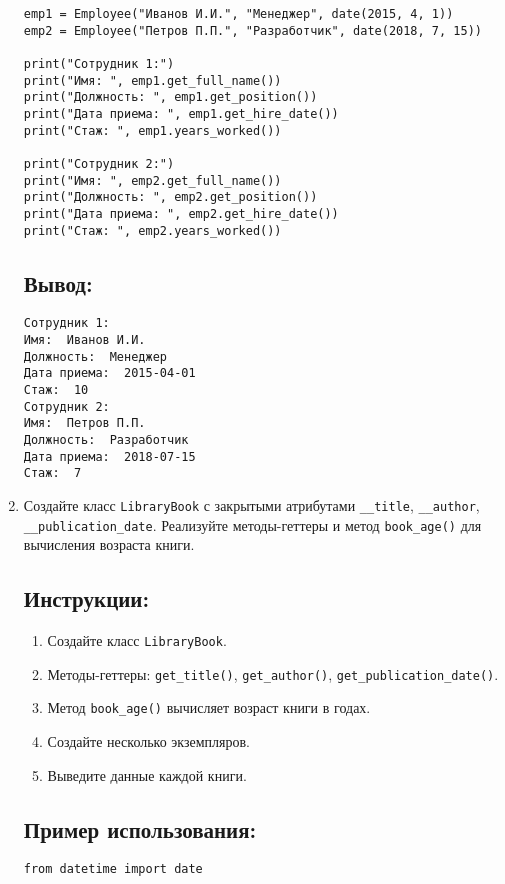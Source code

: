 \begin{enumerate}
\begin{lstlisting}[caption=Пример кода]
emp1 = Employee("Иванов И.И.", "Менеджер", date(2015, 4, 1))
emp2 = Employee("Петров П.П.", "Разработчик", date(2018, 7, 15))

print("Сотрудник 1:")
print("Имя: ", emp1.get_full_name())
print("Должность: ", emp1.get_position())
print("Дата приема: ", emp1.get_hire_date())
print("Стаж: ", emp1.years_worked())

print("Сотрудник 2:")
print("Имя: ", emp2.get_full_name())
print("Должность: ", emp2.get_position())
print("Дата приема: ", emp2.get_hire_date())
print("Стаж: ", emp2.years_worked())
\end{lstlisting}

\subsection*{Вывод:}
\begin{lstlisting}[caption=Ожидаемый вывод]
Сотрудник 1:
Имя:  Иванов И.И.
Должность:  Менеджер
Дата приема:  2015-04-01
Стаж:  10
Сотрудник 2:
Имя:  Петров П.П.
Должность:  Разработчик
Дата приема:  2018-07-15
Стаж:  7
\end{lstlisting}

\item
Создайте класс \texttt{LibraryBook} с закрытыми атрибутами \texttt{\_\_title}, \texttt{\_\_author}, \texttt{\_\_publication\_date}. Реализуйте методы-геттеры и метод \texttt{book\_age()} для вычисления возраста книги.

\subsection*{Инструкции:}
\begin{enumerate}
    \item Создайте класс \texttt{LibraryBook}.
    \item Методы-геттеры: \texttt{get\_title()}, \texttt{get\_author()}, \texttt{get\_publication\_date()}.
    \item Метод \texttt{book\_age()} вычисляет возраст книги в годах.
    \item Создайте несколько экземпляров.
    \item Выведите данные каждой книги.
\end{enumerate}

\subsection*{Пример использования:}
\begin{lstlisting}[caption=Пример кода]
from datetime import date


\end{lstlisting}
\end{enumerate}
